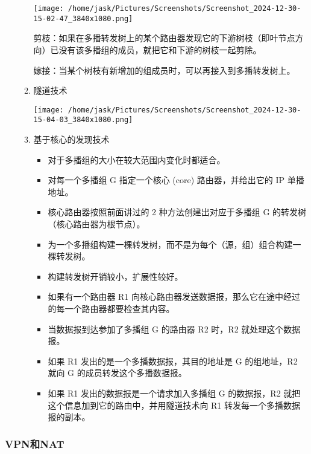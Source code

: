 \documentclass[11pt]{article}
\begin{document}
\begin{enumerate}
\begin{enumerate}
\begin{center}
\texttt{[image: /home/jask/Pictures/Screenshots/Screenshot\_2024-12-30-15-02-47\_3840x1080.png]}
\end{center}

剪枝：如果在多播转发树上的某个路由器发现它的下游树枝（即叶节点方向）已没有该多播组的成员，就把它和下游的树枝一起剪除。

嫁接：当某个树枝有新增加的组成员时，可以再接入到多播转发树上。

\item 隧道技术
\begin{center}
\texttt{[image: /home/jask/Pictures/Screenshots/Screenshot\_2024-12-30-15-04-03\_3840x1080.png]}
\end{center}

\item 基于核心的发现技术
\begin{itemize}
\item 对于多播组的大小在较大范围内变化时都适合。

\item 对每一个多播组 G 指定一个核心 (core) 路由器，并给出它的 IP 单播地址。

\item 核心路由器按照前面讲过的 2 种方法创建出对应于多播组 G 的转发树（核心路由器为根节点）。

\item 为一个多播组构建一棵转发树，而不是为每个（源，组）组合构建一棵转发树。

\item 构建转发树开销较小，扩展性较好。

\item 如果有一个路由器 R1 向核心路由器发送数据报，那么它在途中经过的每一个路由器都要检查其内容。

\item 当数据报到达参加了多播组 G 的路由器 R2 时，R2 就处理这个数据报。

\item 如果 R1 发出的是一个多播数据报，其目的地址是 G 的组地址，R2 就向 G 的成员转发这个多播数据报。

\item 如果 R1 发出的数据报是一个请求加入多播组 G 的数据报，R2 就把这个信息加到它的路由中，并用隧道技术向 R1 转发每一个多播数据报的副本。
\end{itemize}
\end{enumerate}
\end{enumerate}
\subsubsection{VPN和NAT}
\label{sec:org2fded4c}
\end{document}
